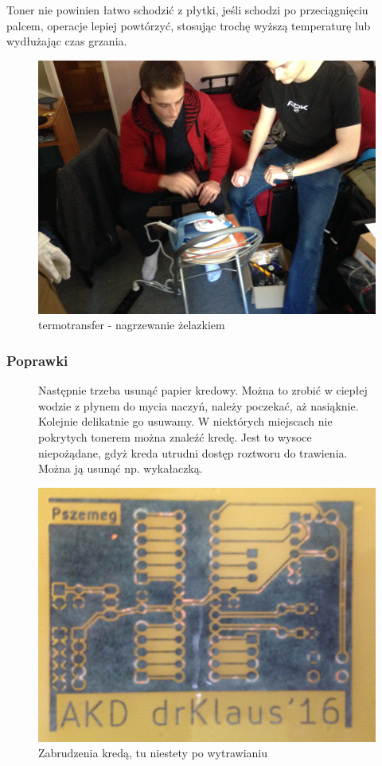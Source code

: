 \documentclass[a4paper,11pt]{article}
\def\SCALE{0.6}
\begin{document}
Toner nie powinien łatwo schodzić z płytki, jeśli schodzi po przeciągnięciu palcem, operacje lepiej powtórzyć, stosując trochę wyższą temperaturę lub wydłużając czas grzania.
\begin{figure}[H]
	\centering
	\includegraphics[width=\SCALE
	\paperwidth]{termotransfer-1}
	\caption{termotransfer - nagrzewanie żelazkiem}
\end{figure}

\subsubsection{Poprawki}

\begin{figure}[H]
	Następnie trzeba usunąć papier kredowy. Można to zrobić w ciepłej wodzie z płynem do mycia naczyń, należy poczekać, aż nasiąknie. Kolejnie delikatnie go usuwamy. W niektórych miejscach nie pokrytych tonerem można znaleźć kredę. Jest to wysoce niepożądane, gdyż kreda utrudni dostęp roztworu do trawienia. Można ją usunąć np. wykałaczką.

	\centering
	\includegraphics[width=\SCALE
	\paperwidth]{ZabrudzeniaKreda}
	\caption{Zabrudzenia kredą, tu niestety po wytrawianiu}
\end{figure}
\end{document}
